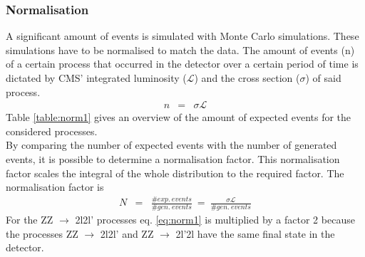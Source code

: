 \documentclass[a4paper,12pt]{article}
\begin{document}
\subsubsection{Normalisation}
A significant amount of events is simulated with Monte Carlo simulations. These simulations have to be normalised to match the data. The amount of events (n) of a certain process that occurred in the detector over a certain period of time is dictated by CMS' integrated luminosity ($\mathcal{L}$) and the cross section ($\sigma$) of said process. 
\begin{eqnarray}
	n &=& \sigma \mathcal{L}
\end{eqnarray}
Table \ref{table:norm1} gives an overview of the amount of expected events for the considered processes.
\\By comparing the number of expected events with the number of generated events, it is possible to determine a normalisation factor. This normalisation factor scales the integral of the whole distribution to the required factor. The normalisation factor is
\begin{eqnarray}
	N &=& \frac{\# exp.\ events}{\# gen.\ events}\ =\ \frac{\sigma \mathcal{L}}{\# gen.\ events}
	\label{eq:norm1}
\end{eqnarray}
For the ZZ $\rightarrow$ 2l2l' processes eq. \ref{eq:norm1} is multiplied by a factor 2 because the processes ZZ $\rightarrow$ 2l2l' and ZZ $\rightarrow$ 2l'2l have the same final state in the detector.
\end{document}
